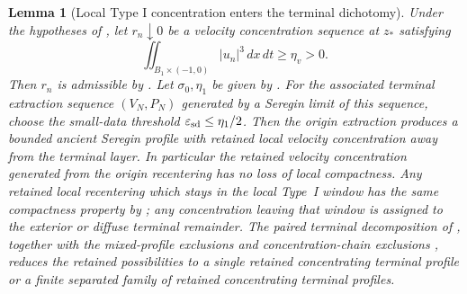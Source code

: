 \documentclass[11pt]{amsart}
\numberwithin{equation}{section}
\theoremstyle{plain}
\newtheorem{lemma}[lemma]{Lemma}
\theoremstyle{definition}
\theoremstyle{remark}
\newcommand{\eps}{\varepsilon}
\begin{document}
\begin{lemma}[Local Type I concentration enters the terminal dichotomy]
\label{lem:local-typeI-into-terminal-dichotomy}
Under the hypotheses of
, let \(r_n\downarrow0\) be a
velocity concentration sequence at \(z_*\) satisfying
\[
   \iint_{B_1\times(-1,0)} |u_n|^3\,dx\,dt\ge\eta_v>0 .
\]
Then \(r_n\) is admissible by .  Let
\(\sigma_0,\eta_1\) be given by
.
For the associated terminal extraction sequence \((V_N,P_N)\) generated by a
Seregin limit of this sequence, choose the small-data threshold
\(\eps_{\rm sd}\le\eta_1/2\).  Then the origin extraction produces a bounded
ancient Seregin profile with retained local velocity concentration away from the
terminal layer.  In particular the retained velocity concentration generated
from the origin recentering has no loss of local compactness.  Any retained
local recentering which stays in the local Type~I window has the same compactness
property by ; any concentration
leaving that window is assigned to the exterior or diffuse terminal remainder.
The paired terminal decomposition of ,
together with the mixed-profile exclusions and concentration-chain exclusions
, reduces the
retained possibilities to a single retained concentrating terminal profile or a
finite separated family of retained concentrating terminal profiles.
\end{lemma}
\end{document}
